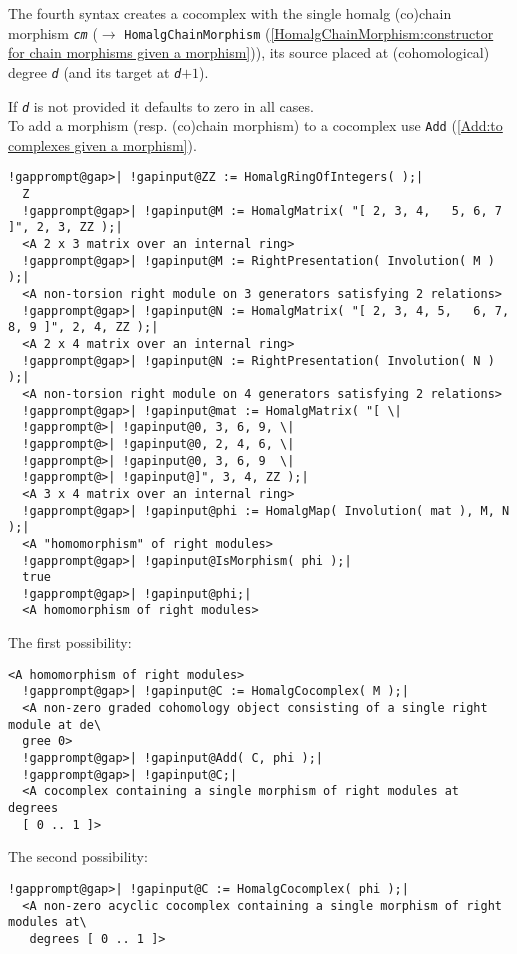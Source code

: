 \documentclass[a4paper,11pt]{report}
\begin{document}
{{{ The fourth syntax creates a cocomplex with the single \textsf{homalg} (co)chain morphism \mbox{\texttt{\mdseries\slshape cm}} ($\to$ \texttt{HomalgChainMorphism} (\ref{HomalgChainMorphism:constructor for chain morphisms given a morphism})), its source placed at (cohomological) degree \mbox{\texttt{\mdseries\slshape d}} (and its target at \mbox{\texttt{\mdseries\slshape d}}$+1$). 

 If \mbox{\texttt{\mdseries\slshape d}} is not provided it defaults to zero in all cases. \\
 To add a morphism (resp. (co)chain morphism) to a cocomplex use \texttt{Add} (\ref{Add:to complexes given a morphism}). 
\begin{Verbatim}[commandchars=!@|,fontsize=\small,frame=single,label=Example]
  !gapprompt@gap>| !gapinput@ZZ := HomalgRingOfIntegers( );|
  Z
  !gapprompt@gap>| !gapinput@M := HomalgMatrix( "[ 2, 3, 4,   5, 6, 7 ]", 2, 3, ZZ );|
  <A 2 x 3 matrix over an internal ring>
  !gapprompt@gap>| !gapinput@M := RightPresentation( Involution( M ) );|
  <A non-torsion right module on 3 generators satisfying 2 relations>
  !gapprompt@gap>| !gapinput@N := HomalgMatrix( "[ 2, 3, 4, 5,   6, 7, 8, 9 ]", 2, 4, ZZ );|
  <A 2 x 4 matrix over an internal ring>
  !gapprompt@gap>| !gapinput@N := RightPresentation( Involution( N ) );|
  <A non-torsion right module on 4 generators satisfying 2 relations>
  !gapprompt@gap>| !gapinput@mat := HomalgMatrix( "[ \|
  !gapprompt@>| !gapinput@0, 3, 6, 9, \|
  !gapprompt@>| !gapinput@0, 2, 4, 6, \|
  !gapprompt@>| !gapinput@0, 3, 6, 9  \|
  !gapprompt@>| !gapinput@]", 3, 4, ZZ );|
  <A 3 x 4 matrix over an internal ring>
  !gapprompt@gap>| !gapinput@phi := HomalgMap( Involution( mat ), M, N );|
  <A "homomorphism" of right modules>
  !gapprompt@gap>| !gapinput@IsMorphism( phi );|
  true
  !gapprompt@gap>| !gapinput@phi;|
  <A homomorphism of right modules>
\end{Verbatim}
 The first possibility: 
\begin{Verbatim}[commandchars=!@|,fontsize=\small,frame=single,label=Example]
  <A homomorphism of right modules>
  !gapprompt@gap>| !gapinput@C := HomalgCocomplex( M );|
  <A non-zero graded cohomology object consisting of a single right module at de\
  gree 0>
  !gapprompt@gap>| !gapinput@Add( C, phi );|
  !gapprompt@gap>| !gapinput@C;|
  <A cocomplex containing a single morphism of right modules at degrees
  [ 0 .. 1 ]>
\end{Verbatim}
 The second possibility: 
\begin{Verbatim}[commandchars=!@|,fontsize=\small,frame=single,label=Example]
  !gapprompt@gap>| !gapinput@C := HomalgCocomplex( phi );|
  <A non-zero acyclic cocomplex containing a single morphism of right modules at\
   degrees [ 0 .. 1 ]>
\end{Verbatim}
 }

}}
\end{document}
